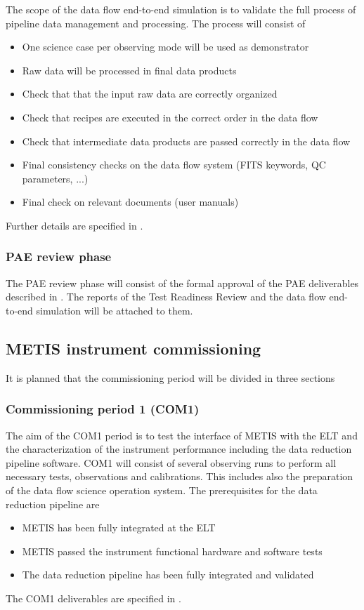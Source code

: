 The scope of the data flow end-to-end simulation is to validate the full process of pipeline data management and processing. The process will consist of
\begin{itemize}
    \item One science case per observing mode will be used as demonstrator
    \item Raw data will be processed in final data products
    \item Check that that the input raw data are correctly organized
    \item Check that recipes are executed in the correct order in the data flow
    \item Check that intermediate data products are passed correctly in the data flow
    \item Final consistency checks on the data flow system (FITS keywords, QC parameters, ...)
    \item Final check on relevant documents (user manuals)
\end{itemize}
Further details are specified in \cite{DRLVT}.

\subsubsection{PAE review phase}
\label{sssec:paw_review}

The PAE review phase will consist of the formal approval of the PAE deliverables described in \cite{1618}. The reports of the Test Readiness Review and the data flow end-to-end simulation will be attached to them. 

\subsection{METIS instrument commissioning}
\label{ssec:com}

It is planned that the commissioning period will be divided in three sections

\subsubsection{Commissioning period 1 (COM1)}
\label{ssec:com1}

The aim of the COM1 period is to test the interface of METIS with the ELT and the characterization of the instrument performance including the data reduction pipeline software. COM1 will consist of several observing runs to perform all necessary tests, observations and calibrations. This includes also the preparation of the data flow science operation system. The prerequisites for the data reduction pipeline are
\begin{itemize}
    \item METIS has been fully integrated at the ELT
    \item METIS passed the instrument functional hardware and software tests
    \item The data reduction pipeline  has been fully integrated and validated
\end{itemize}
The COM1 deliverables are specified in \cite{1618}.


